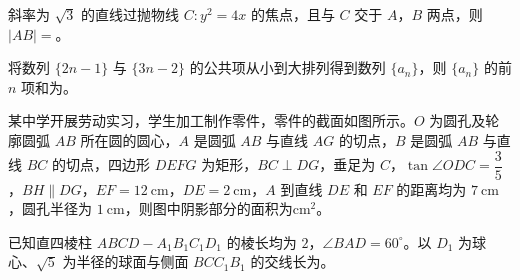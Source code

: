 \begin{question}
斜率为 $\sqrt3$ 的直线过抛物线 $C:y^2=4x$ 的焦点，且与 $C$ 交于 $A$，$B$ 两点，则 $|AB|=$\gkblank{}。

\end{question}
\begin{question}
将数列 $\{2n-1\}$ 与 $\{3n-2\}$ 的公共项从小到大排列得到数列 $\{a_n\}$，则 $\{a_n\}$ 的前 $n$ 项和为\gkblank{}。

\Needspace{0.4\textheight}
\end{question}
\begin{question}
某中学开展劳动实习，学生加工制作零件，零件的截面如图所示。$O$ 为圆孔及轮廓圆弧 $AB$ 所在圆的圆心，$A$ 是圆弧 $AB$ 与直线 $AG$ 的切点，$B$ 是圆弧 $AB$ 与直线 $BC$ 的切点，四边形 $DEFG$ 为矩形，$BC\perp DG$，垂足为 $C$，$\tan\angle ODC=\dfrac35$，$BH\parallel DG$，$EF=12\ \mathrm{cm}$，$DE=2\ \mathrm{cm}$，$A$ 到直线 $DE$ 和 $EF$ 的距离均为 $7\ \mathrm{cm}$，圆孔半径为 $1\ \mathrm{cm}$，则图中阴影部分的面积为\gkblank{}$\mathrm{cm}^2$。
\nopagebreak[4]
\begin{center}\end{center}
\nopagebreak[4]
\end{question}
\begin{question}
已知直四棱柱 $ABCD-A_1B_1C_1D_1$ 的棱长均为 $2$，$\angle BAD=60^\circ$。以 $D_1$ 为球心、$\sqrt5$ 为半径的球面与侧面 $BCC_1B_1$ 的交线长为\gkblank{}。

\end{question}

